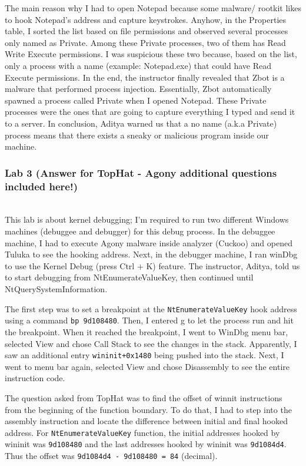 \documentclass[letterpaper,10pt,titlepage,draftclsnofoot,onecolumn]{IEEEtran}
\begin{document}
The main reason why I had to open Notepad because some malware/ rootkit likes to hook Notepad's address and capture keystrokes.
Anyhow, in the Properties table, I sorted the list based on file permissions and observed several processes only named as Private. 
Among these Private processes, two of them has Read Write Execute permissions.
I was suspicious these two because, based on the list, only a process with a name (example: Notepad.exe) that could have Read Execute permissions.
In the end, the instructor finally revealed that Zbot is a malware that performed process injection. 
Essentially, Zbot automatically spawned a process called Private when I opened Notepad.
These Private processes were the ones that are going to capture everything I typed and send it to a server.
In conclusion, Aditya warned us that a no name (a.k.a Private) process means that there exists a sneaky or malicious program inside our machine.
\hfill\\
\subsubsection{Lab 3 (Answer for TopHat - Agony additional questions included here!)}
\hfill\\

This lab is about kernel debugging; I'm required to run two different Windows machines (debuggee and debugger) for this debug process.
In the debuggee machine, I had to execute Agony malware inside analyzer (Cuckoo) and opened Tuluka to see the hooking address.
Next, in the debugger machine, I ran winDbg to use the Kernel Debug (press Ctrl + K) feature.
The instructor, Aditya, told us to start debugging from NtEnumerateValueKey, then continued until NtQuerySystemInformation.

The first step was to set a breakpoint at the \verb|NtEnumerateValueKey| hook address using a command \verb|bp 9d108480|.
Then, I entered g to let the process run and hit the breakpoint.
When it reached the breakpoint, I went to WinDbg menu bar, selected View and chose Call Stack to see the changes in the stack.
Apparently, I saw an additional entry \verb|wininit+0x1480| being pushed into the stack.
Next, I went to menu bar again, selected View and chose Disassembly to see the entire instruction code. 

The question asked from TopHat was to find the offset of winnit instructions from the beginning of the function boundary.
To do that, I had to step into the assembly instruction and locate the difference between initial and final hooked address. 
For \verb|NtEnumerateValueKey| function, the initial addresses hooked by wininit was \verb|9d108480| and the last addresses hooked by wininit was \verb|9d1084d4|.
Thus the offset was \verb|9d1084d4 - 9d108480 = 84| (decimal).
\end{document}

